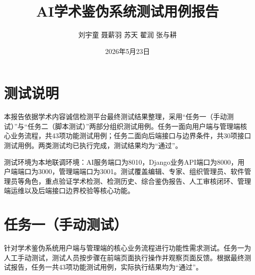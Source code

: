 \documentclass[UTF8,a4paper,12pt]{ctexart}
\title{\textbf{AI学术鉴伪系统测试用例报告}}
\author{刘宇童 \space 聂薪羽 \space 苏天 \space 翟润 \space 张与耕}
\date{2026年5月23日}
\begin{document}
\maketitle

\section*{测试说明}

本报告依据学术内容诚信检测平台最终测试结果整理，采用“任务一（手动测试）”与“任务二（脚本测试）”两部分组织测试用例。任务一面向用户端与管理端核心业务流程，共43项功能测试用例；任务二面向后端接口与边界条件，共30项接口测试用例。两类测试均已执行完成，测试结果均为“通过”。

测试环境为本地联调环境：AI服务端口为8010，Django业务API端口为8000，用户端端口为3000，管理端端口为3001。测试覆盖编辑、专家、组织管理员、软件管理员等角色，重点验证学术检测、检测历史、综合鉴伪报告、人工审核闭环、管理端运维以及后端接口边界校验等核心功能。

\section{任务一（手动测试）}

针对学术鉴伪系统用户端与管理端的核心业务流程进行功能性需求测试。任务一为人工手动测试，测试人员按步骤在前端页面执行操作并观察页面反馈。根据最终测试报告，任务一共43项功能测试用例，实际执行结果均为“通过”。
\end{document}
